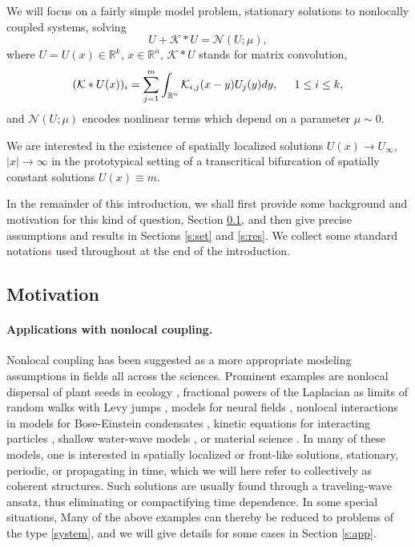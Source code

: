 \documentclass[10pt]{article}
\newcommand{\R}{\mathbb{R}}
\newcommand{\Nl}{\mathcal{N}}
\newcommand{\K}{\mathcal{K}}
\begin{document}
We will focus on a fairly simple model problem, stationary solutions to nonlocally coupled systems, solving
\begin{equation} \label{system}
U+\K\ast U = \Nl(U;\mu) ,
\end{equation}
where $U=U(x)\in\R^k$, $x\in\R^n$, $\K\ast U$ stands for matrix convolution,
\[
(\K\ast U(x))_i = \sum_{j=1}^m \int_{\R^n} \K_{i,j}(x-y)U_j(y)dy, \hspace{0.2in} 1\le i\le k,
\]
and $\Nl(U;\mu)$ encodes nonlinear terms which depend on a parameter $\mu\sim 0$. 

We are interested in the existence of spatially localized solutions $U(x)\to U_\infty$, $|x|\to\infty$ in the  prototypical setting of a transcritical bifurcation of spatially constant solutions $U(x)\equiv m$. 

In the remainder of this introduction, we shall first provide some background and motivation for this kind of question, Section \ref{s:mot}, and then give precise assumptions and results in Sections \ref{s:set} and \ref{s:res}. We collect some standard notation\textcolor{red}s used throughout at the end of the introduction. 


\subsection{Motivation}\label{s:mot}

\paragraph{Applications with nonlocal coupling.} Nonlocal coupling has been suggested as a more appropriate modeling assumptions in fields all across the sciences. Prominent examples are nonlocal dispersal of plant seeds in ecology \cite{plantdisp}, fractional powers of the Laplacian as limits of random walks with Levy jumps \cite{levy}, models for neural fields \cite{neuralfieldrev}, nonlocal interactions in models for Bose-Einstein condensates \cite{bose}, kinetic equations for interacting particles \cite{swarmingrev}, shallow water-wave models \cite{waterwave}, or material science \cite{matsci}. In many of these models, one is interested in spatially localized or front-like solutions, stationary, periodic,  or  propagating in time,  which we will here refer to collectively as  coherent structures. Such solutions are usually found through a traveling-wave ansatz, thus eliminating or compactifying time dependence.  In some special situations, Many of the above examples can thereby be reduced to problems of the type \eqref{system}, and we will give details for some cases in Section \ref{s:app}. 
\end{document}

